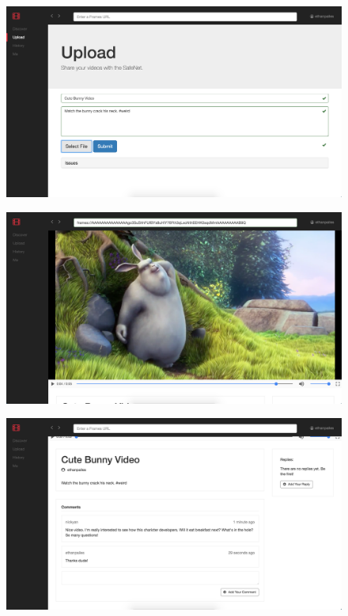 \documentclass[final]{beamer}
\newlength{\onecolwid}
\begin{document}
\begin{frame}[t]
\begin{columns}[t]
\begin{column}{\onecolwid}
\begin{block}{}
  \begin{figure}
  \includegraphics[width=0.8\linewidth]{upload-page.png}
  \captionsetup{labelformat=empty}
  \label{fig:upload-page}
  \end{figure}

  \begin{figure}
  \includegraphics[width=0.8\linewidth]{watch-page.png}
  \captionsetup{labelformat=empty}
  \label{fig:watch-page}
  \end{figure}

  \begin{figure}
  \includegraphics[width=0.8\linewidth]{watch-page-comments.png}
  \captionsetup{labelformat=empty}
  \label{fig:watch-page-comments}
  \end{figure}


\end{block}
\end{column}
\end{columns}
\end{frame}
\end{document}
